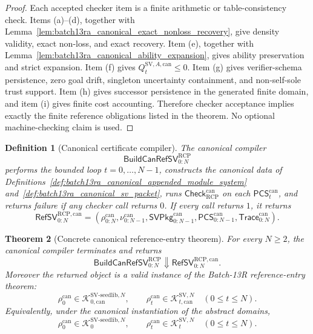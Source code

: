\documentclass[11pt]{article}
\newtheorem{theorem}{Theorem}[section]
\newtheorem{definition}[theorem]{Definition}
\newcommand{\1}{\mathbf{1}}
\newcommand{\RCP}{\mathrm{RCP}}
\providecommand{\Kcal}{\mathcal{K}}
\begin{document}
\begin{proof}
Each accepted checker item is a finite arithmetic or table-consistency check.  Items (a)--(d), together with Lemma~\ref{lem:batch13ra_canonical_exact_nonloss_recovery}, give density validity, exact non-loss, and exact recovery.  Item (e), together with Lemma~\ref{lem:batch13ra_canonical_ability_expansion}, gives ability preservation and strict expansion.  Item (f) gives \(Q_t^{\mathrm{SV},A,\mathrm{can}}\le0\).  Item (g) gives verifier-schema persistence, zero goal drift, singleton uncertainty containment, and non-self-sole trust support.  Item (h) gives successor persistence in the generated finite domain, and item (i) gives finite cost accounting.  Therefore checker acceptance implies exactly the finite reference obligations listed in the theorem.  No optional machine-checking claim is used.
\end{proof}

\begin{definition}[Canonical certificate compiler]
\label{def:batch13ra_canonical_certificate_compiler}
The canonical compiler
\[
\mathsf{BuildCanRefSV}_{0:N}^{\RCP}
\]
performs the bounded loop \(t=0,\ldots,N-1\), constructs the canonical data of Definitions~\ref{def:batch13ra_canonical_appended_module_system} and~\ref{def:batch13ra_canonical_sv_packet}, runs \(\mathsf{Check}_{\RCP}^{\mathrm{can}}\) on each \(\mathsf{PCS}_t^{\mathrm{can}}\), and returns failure if any checker call returns \(0\).  If every call returns \(1\), it returns
\[
\mathsf{RefSV}_{0:N}^{\RCP,\mathrm{can}}
=
(\rho_{0:N}^{\mathrm{can}},\nu_{0:N-1}^{\mathrm{can}},
\mathsf{SVPkg}_{0:N-1}^{\mathrm{can}},
\mathsf{PCS}_{0:N-1}^{\mathrm{can}},
\mathsf{Trace}_{0:N}^{\mathrm{can}}).
\]
\end{definition}

\begin{theorem}[Concrete canonical reference-entry theorem]
\label{thm:batch13ra_canonical_reference_entry}
For every \(N\ge2\), the canonical compiler terminates and returns
\[
\mathsf{BuildCanRefSV}_{0:N}^{\RCP}
\Downarrow
\mathsf{RefSV}_{0:N}^{\RCP,\mathrm{can}}.
\]
Moreover the returned object is a valid instance of the Batch-13R reference-entry theorem:
\[
\rho_0^{\mathrm{can}}
\in
\Kcal_{0,\mathrm{can}}^{\mathrm{SV\mbox{-}seedlib},N},
\qquad
\rho_t^{\mathrm{can}}
\in
\Kcal_{t,\mathrm{can}}^{\mathrm{SV},N}
\quad(0\le t\le N).
\]
Equivalently, under the canonical instantiation of the abstract domains,
\[
\boxed{
\rho_0^{\mathrm{can}}
\in
\Kcal_0^{\mathrm{SV\mbox{-}seedlib},N},
\qquad
\rho_t^{\mathrm{can}}
\in
\Kcal_t^{\mathrm{SV},N}
\quad(0\le t\le N).
}
\]
\end{theorem}
\end{document}
